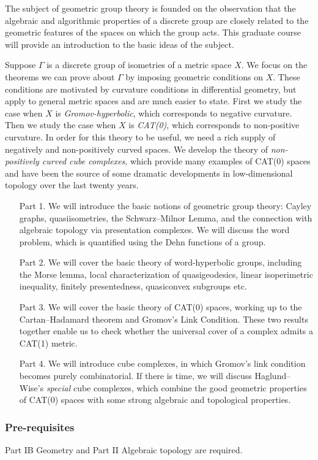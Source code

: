 \documentclass[a4paper]{article}
\begin{document}
\maketitle
{\small
\setlength{\parindent}{0em}
\setlength{\parskip}{1em}

The subject of geometric group theory is founded on the observation that the algebraic and algorithmic properties of a discrete group are closely related to the geometric features of the spaces on which the group acts. This graduate course will provide an introduction to the basic ideas of the subject.

Suppose $\Gamma$ is a discrete group of isometries of a metric space $X$. We focus on the theorems we can prove about $\Gamma$ by imposing geometric conditions on $X$. These conditions are motivated by curvature conditions in differential geometry, but apply to general metric spaces and are much easier to state. First we study the case when $X$ is \emph{Gromov-hyperbolic}, which corresponds to negative curvature. Then we study the case when $X$ is \emph{CAT(0)}, which corresponds to non-positive curvature. In order for this theory to be useful, we need a rich supply of negatively and non-positively curved spaces. We develop the theory of \emph{non-positively curved cube complexes}, which provide many examples of CAT(0) spaces and have been the source of some dramatic developments in low-dimensional topology over the last twenty years.

\begin{itemize}
 \item[Part 1.] We will introduce the basic notions of geometric group theory: Cayley graphs, quasiisometries, the Schwarz--Milnor Lemma, and the connection with algebraic topology via presentation complexes. We will discuss the word problem, which is quantified using the Dehn functions of a group.
 \item[Part 2.] We will cover the basic theory of word-hyperbolic groups, including the Morse lemma, local characterization of quasigeodesics, linear isoperimetric inequality, finitely presentedness, quasiconvex subgroups etc.
 \item[Part 3.] We will cover the basic theory of CAT(0) spaces, working up to the Cartan--Hadamard theorem and Gromov's Link Condition. These two results together enable us to check whether the universal cover of a complex admits a CAT(1) metric.
 \item[Part 4.] We will introduce cube complexes, in which Gromov's link condition becomes purely combinatorial. If there is time, we will discuss Haglund--Wise's \emph{special} cube complexes, which combine the good geometric properties of CAT(0) spaces with some strong algebraic and topological properties.
\end{itemize}

\subsubsection*{Pre-requisites}
Part IB Geometry and Part II Algebraic topology are required.
}
\end{document}
